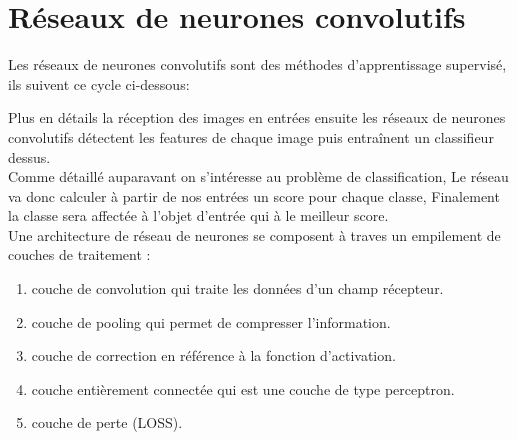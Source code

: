\documentclass[french,a4paper,11pt,oneside]{article}
\begin{document}
	\section{Réseaux de neurones convolutifs }{
		Les réseaux de neurones convolutifs sont des méthodes d'apprentissage supervisé, ils suivent ce cycle ci-dessous:\\
		\newpage
		Plus en détails la réception des images en entrées ensuite les réseaux de neurones convolutifs détectent les features de chaque image puis entraînent un classifieur dessus.\\
		
		Comme détaillé auparavant on s'intéresse au problème de classification, Le réseau va donc calculer à partir de nos entrées un score pour chaque classe, Finalement la classe sera affectée à l'objet d'entrée qui à le meilleur score.\\
		
		Une architecture de réseau de neurones se composent à traves un empilement de couches de traitement :
		\begin{enumerate}
			\item couche de convolution qui traite les données d'un champ récepteur.
			\item couche de pooling qui permet de compresser l'information.
			\item couche de correction en référence à la fonction d'activation.
			\item couche entièrement connectée qui est une couche de type perceptron.
			\item couche de perte (LOSS). 
		\end{enumerate}

}
\end{document}
